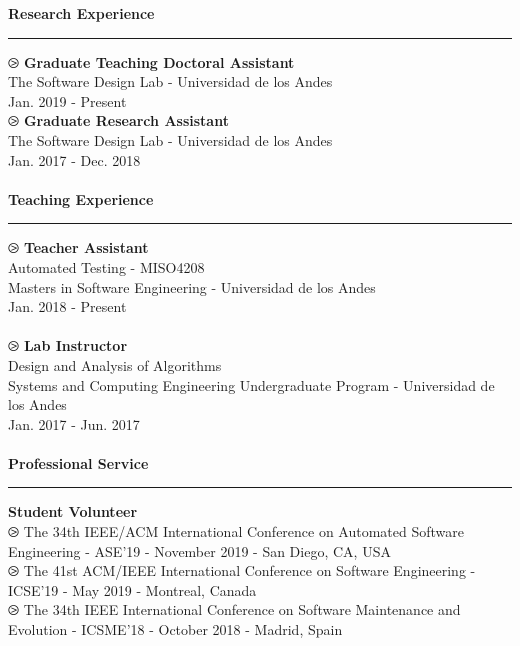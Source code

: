 \documentclass[letterpaper,11pt,oneside]{article}
\begin{document}
\noindent \Large{\textbf{Research Experience}} \\
\vspace{-2ex}
\hrule 
\normalsize
\vspace{2ex}
\noindent $\ogreaterthan$ \textbf{Graduate Teaching Doctoral Assistant} \\
	The Software Design Lab - Universidad de los Andes \\
	Jan. 2019 - Present\\
\noindent $\ogreaterthan$ \textbf{Graduate Research Assistant} \\
The Software Design Lab - Universidad de los Andes \\
Jan. 2017 - Dec. 2018\\
\\
\noindent \Large{\textbf{Teaching Experience}} \\
\vspace{-2ex}
\hrule 
\normalsize
\vspace{2ex}
\noindent $\ogreaterthan$ \textbf{Teacher Assistant} \\
Automated Testing - MISO4208 \\
Masters in Software Engineering - Universidad de los Andes \\
Jan. 2018 - Present\\
\\
\noindent $\ogreaterthan$ \textbf{Lab Instructor} \\
Design and Analysis of Algorithms \\
Systems and Computing Engineering Undergraduate Program - Universidad de los Andes \\
Jan. 2017 - Jun. 2017\\
\\
\noindent \Large{\textbf{Professional Service}} \\
\vspace{-2ex}
\hrule 
\normalsize
\vspace{2ex}
\noindent \textbf{Student Volunteer} \\
$\ogreaterthan$ The 34th IEEE/ACM International Conference on Automated Software Engineering - ASE'19 - November 2019 - San Diego, CA, USA \\
$\ogreaterthan$ The 41st ACM/IEEE International Conference on Software Engineering - ICSE'19 - May 2019 - Montreal, Canada \\
$\ogreaterthan$ The 34th IEEE International Conference on Software Maintenance and Evolution - ICSME'18 - October 2018 - Madrid, Spain \\
\end{document}
